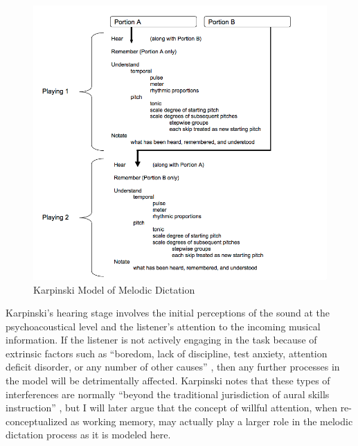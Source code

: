 \documentclass[12pt,]{book}
\begin{document}
\begin{figure}

{\centering \includegraphics[width=1\linewidth]{img/karpinski31} 

}

\caption{Karpinski Model of Melodic Dictation}\label{fig:flowchart}
\end{figure}

Karpinski's hearing stage involves the initial perceptions of the sound at the psychoacoustical level and the listener's attention to the incoming musical information.
If the listener is not actively engaging in the task because of extrinsic factors such as ``boredom, lack of discipline, test anxiety, attention deficit disorder, or any number of other causes'' \citep[p.65]{karpinskiAuralSkillsAcquisition2000}, then any further processes in the model will be detrimentally affected.
Karpinski notes that these types of interferences are normally ``beyond the traditional jurisdiction of aural skills instruction'' \citep[p.65]{karpinskiAuralSkillsAcquisition2000}, but I will later argue that the concept of willful attention, when re-conceptualized as working memory, may actually play a larger role in the melodic dictation process as it is modeled here.
\end{document}
